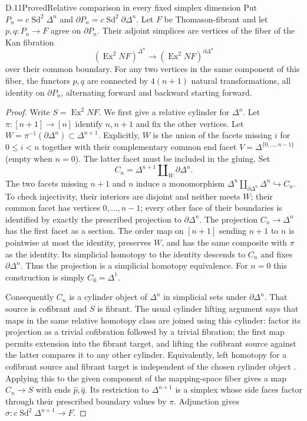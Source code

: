 \begin{claim}{D.11}{Proved}{Relative comparison in every fixed simplex dimension}
Put $P_n=c\operatorname{Sd}^2\Delta^n$ and $\partial P_n=c\operatorname{Sd}^2\partial\Delta^n$. Let $F$ be Thomason-fibrant and let $p,q:P_n\to F$ agree on $\partial P_n$. Their adjoint simplices are vertices of the fiber of the Kan fibration
\[
 (\operatorname{Ex}^2NF)^{\Delta^n}\longrightarrow
 (\operatorname{Ex}^2NF)^{\partial\Delta^n}
\]
over their common boundary. For any two vertices in the same component of this fiber, the functors $p,q$ are connected by $4(n+1)$ natural transformations, all identity on $\partial P_n$, alternating forward and backward starting forward.
\end{claim}
\begin{proof}
Write $S=\operatorname{Ex}^2NF$. We first give a relative cylinder for $\Delta^n$. Let $\pi:[n+1]\to[n]$ identify $n,n+1$ and fix the other vertices. Let $W=\pi^{-1}(\partial\Delta^n)\subset\Delta^{n+1}$. Explicitly, $W$ is the union of the facets missing $i$ for $0\le i<n$ together with their complementary common end facet $V=\Delta^{\{0,\ldots,n-1\}}$ (empty when $n=0$). The latter facet must be included in the gluing. Set
\[
 C_n=\Delta^{n+1}\amalg_W\partial\Delta^n.
\]
The two facets missing $n+1$ and $n$ induce a monomorphism
$\Delta^n\amalg_{\partial\Delta^n}\Delta^n\hookrightarrow C_n$.
To check injectivity, their interiors are disjoint and neither meets $W$; their common facet has vertices $0,\ldots,n-1$; every other face of their boundaries is identified by exactly the prescribed projection to $\partial\Delta^n$. The projection $C_n\to\Delta^n$ has the first facet as a section. The order map on $[n+1]$ sending $n+1$ to $n$ is pointwise at most the identity, preserves $W$, and has the same composite with $\pi$ as the identity. Its simplicial homotopy to the identity descends to $C_n$ and fixes $\partial\Delta^n$. Thus the projection is a simplicial homotopy equivalence. For $n=0$ this construction is simply $C_0=\Delta^1$.

Consequently $C_n$ is a cylinder object of $\Delta^n$ in simplicial sets under $\partial\Delta^n$. That source is cofibrant and $S$ is fibrant. The usual cylinder lifting argument says that maps in the same relative homotopy class are joined using this cylinder: factor its projection as a trivial cofibration followed by a trivial fibration; the first map permits extension into the fibrant target, and lifting the cofibrant source against the latter compares it to any other cylinder. Equivalently, left homotopy for a cofibrant source and fibrant target is independent of the chosen cylinder object \citep[Proposition~A.2.2.1]{CpathsLurieHTT}. Applying this to the given component of the mapping-space fiber gives a map $C_n\to S$ with ends $\widehat p,\widehat q$. Its restriction to $\Delta^{n+1}$ is a simplex whose side faces factor through their prescribed boundary values by $\pi$. Adjunction gives
$\sigma:c\operatorname{Sd}^2\Delta^{n+1}\to F$.


\end{proof}
